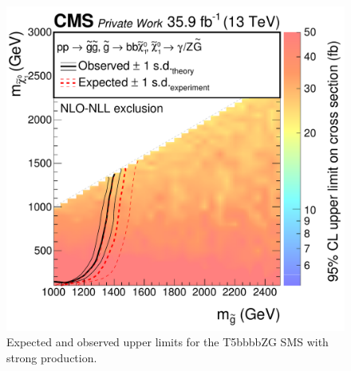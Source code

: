 \begin{figure}[tbp]
 \centering
 \includegraphics[width=\pairwidth]{figures/UnblindingPlots/T5bbbbZg_limits_XSEC2}
 \caption{Expected and observed upper limits for the T5bbbbZG SMS with strong production.}
 \label{fig:limitStrong}
\end{figure}
